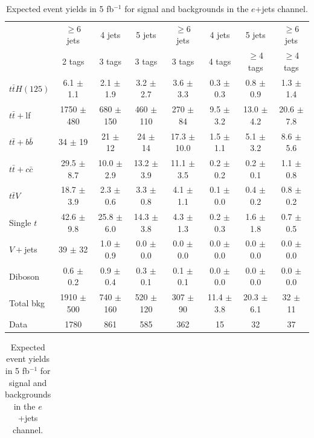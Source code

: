 \begin{table}
\begin{adjustwidth}{-1.7in}{-1.7in}
  \centering
  \noindent
  \small
    \caption{Expected event yields in 5 fb$^{-1}$ for signal and backgrounds in the $\mu$+jets channel.}
    \label{tab:dataMC_LJeventyield_mu}
    \begin{tabular}{|l|c|c|c|c|c|c|c|} \hline
& $\geq$6 jets & 4 jets & 5 jets & $\geq$6 jets & 4 jets & 5 jets & $\geq$6 jets \\
& 2 tags & 3 tags & 3 tags & 3 tags & 4 tags & $\geq$4 tags & $\geq$4 tags \\ \hline \hline
$t\bar{t}H(125)$ & 6.1 $\pm$ 1.1 & 2.1 $\pm$ 1.9 & 3.2 $\pm$ 2.7 & 3.6 $\pm$ 3.3 & 0.3 $\pm$ 0.3 & 0.8 $\pm$ 0.9 & 1.3 $\pm$ 1.4 \\
 \hline
$t\bar{t}+$lf & 1750 $\pm$ 480 & 680 $\pm$ 150 & 460 $\pm$ 110 & 270 $\pm$ 84 & 9.5 $\pm$ 3.2 & 13.0 $\pm$ 4.2 & 20.6 $\pm$ 7.8 \\
$t\bar{t}+b\bar{b}$ & 34 $\pm$ 19 & 21 $\pm$ 12 & 24 $\pm$ 14 & 17.3 $\pm$ 10.0 & 1.5 $\pm$ 1.1 & 5.1 $\pm$ 3.2 & 8.6 $\pm$ 5.6 \\
$t\bar{t}+c\bar{c}$ & 29.5 $\pm$ 8.7 & 10.0 $\pm$ 2.9 & 13.2 $\pm$ 3.9 & 11.1 $\pm$ 3.5 & 0.2 $\pm$ 0.2 & 0.2 $\pm$ 0.1 & 1.1 $\pm$ 0.8 \\
$t\bar{t}V$ & 18.7 $\pm$ 3.9 & 2.3 $\pm$ 0.6 & 3.3 $\pm$ 0.8 & 4.1 $\pm$ 1.1 & 0.1 $\pm$ 0.0 & 0.4 $\pm$ 0.2 & 0.8 $\pm$ 0.2 \\
Single $t$ & 42.6 $\pm$ 9.8 & 25.8 $\pm$ 6.0 & 14.3 $\pm$ 3.8 & 4.3 $\pm$ 1.3 & 0.2 $\pm$ 0.3 & 1.6 $\pm$ 1.8 & 0.7 $\pm$ 0.5 \\
$V+$jets & 39 $\pm$ 32 & 1.0 $\pm$ 0.9 & 0.0 $\pm$ 0.0 & 0.0 $\pm$ 0.0 & 0.0 $\pm$ 0.0 & 0.0 $\pm$ 0.0 & 0.0 $\pm$ 0.0 \\
Diboson & 0.6 $\pm$ 0.2 & 0.9 $\pm$ 0.4 & 0.3 $\pm$ 0.1 & 0.1 $\pm$ 0.1 & 0.0 $\pm$ 0.0 & 0.0 $\pm$ 0.0 & 0.0 $\pm$ 0.0 \\
 \hline
Total bkg & 1910 $\pm$ 500 & 740 $\pm$ 160 & 520 $\pm$ 120 & 307 $\pm$ 90 & 11.4 $\pm$ 3.8 & 20.3 $\pm$ 6.1 & 32 $\pm$ 11 \\
 \hline
Data & 1780 & 861 & 585 & 362 & 15 & 32 & 37 \\
\hline
\end{tabular}
\vspace{10 mm}
  \noindent
  \small
    \caption{Expected event yields in 5 fb$^{-1}$ for signal and backgrounds in the $e$+jets channel.}
    \label{tab:dataMC_LJeventyield_ele}
    \begin{tabular}{|l|c|c|c|c|c|c|c|} \hline

\end{tabular}
\end{adjustwidth}
\end{table}
